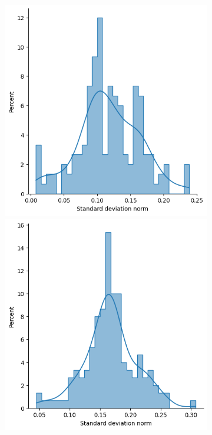 \begin{figure}[htb]
\begin{subfigure}[t]{0.315\textwidth}
            \includegraphics[width=\textwidth]{figures/ensemble/matched_max_std_norms.png}
            \includegraphics[width=\textwidth]{figures/imle/matched_max_std_norms.png}

\end{subfigure}
\end{figure}
